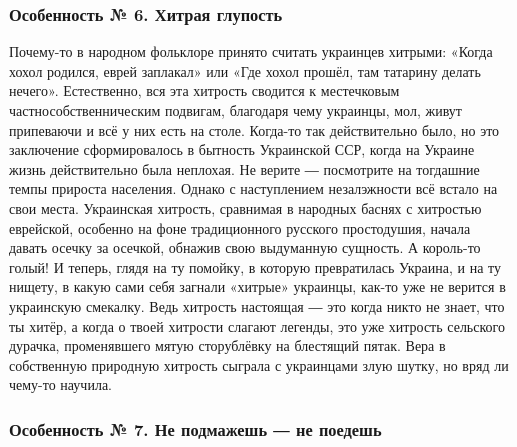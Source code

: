 \subsubsection{Особенность № 6. Хитрая глупость}

Почему-то в народном фольклоре принято считать украинцев хитрыми: «Когда хохол
родился, еврей заплакал» или «Где хохол прошёл, там татарину делать нечего».
Естественно, вся эта хитрость сводится к местечковым частнособственническим
подвигам, благодаря чему украинцы, мол, живут припеваючи и всё у них есть на
столе. Когда-то так действительно было, но это заключение сформировалось в
бытность Украинской ССР, когда на Украине жизнь действительно была неплохая. Не
верите ― посмотрите на тогдашние темпы прироста населения. Однако с
наступлением незалэжности всё встало на свои места. Украинская хитрость,
сравнимая в народных баснях с хитростью еврейской, особенно на фоне
традиционного русского простодушия, начала давать осечку за осечкой, обнажив
свою выдуманную сущность. А король-то голый! И теперь, глядя на ту помойку, в
которую превратилась Украина, и на ту нищету, в какую сами себя загнали
«хитрые» украинцы, как-то уже не верится в украинскую смекалку. Ведь хитрость
настоящая ― это когда никто не знает, что ты хитёр, а когда о твоей хитрости
слагают легенды, это уже хитрость сельского дурачка, променявшего мятую
сторублёвку на блестящий пятак. Вера в собственную природную хитрость сыграла с
украинцами злую шутку, но вряд ли чему-то научила.

\subsubsection{Особенность № 7. Не подмажешь ― не поедешь}

